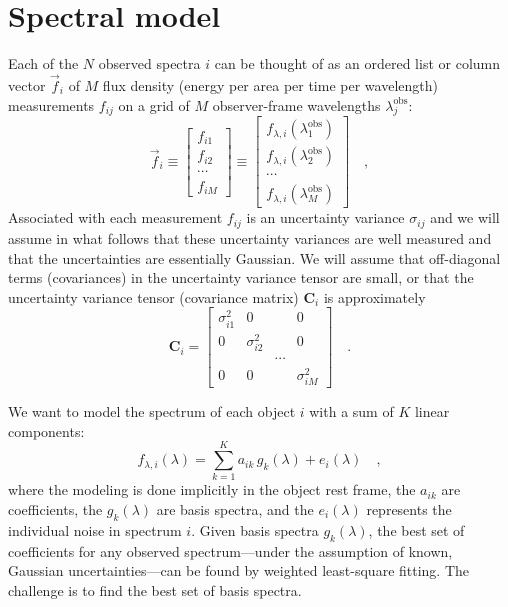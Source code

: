 \documentclass[12pt,preprint]{aastex}
\begin{document}
\section{Spectral model}\label{sec:model}
Each of the $N$ observed spectra $i$ can be thought of as an ordered
list or column vector $\vec{f}_i$ of $M$ flux density (energy per area
per time per wavelength) measurements $f_{ij}$ on a grid of $M$
observer-frame wavelengths $\lambda^{\mathrm{obs}}_j$:
\begin{equation}
\vec{f}_i
\equiv \left[\begin{array}{c} f_{i1} \\
                              f_{i2} \\
                              \cdots \\
                              f_{iM} \end{array}\right]
\equiv \left[\begin{array}{c} f_{\lambda,i}(\lambda^{\mathrm{obs}}_1) \\
                              f_{\lambda,i}(\lambda^{\mathrm{obs}}_2) \\
                                                \cdots \\
                              f_{\lambda,i}(\lambda^{\mathrm{obs}}_M) \end{array}\right]
\quad ,
\end{equation}
Associated with each measurement $f_{ij}$ is an uncertainty variance
$\sigma_{ij}$ and we will assume in what follows that these
uncertainty variances are well measured and that the uncertainties are
essentially Gaussian.  We will assume that off-diagonal terms
(covariances) in the uncertainty variance tensor are small, or that
the uncertainty variance tensor (covariance matrix) $\textbf{C}_i$ is
approximately
\begin{equation}
\textbf{C}_i =
 \left[\begin{array}{cccc} \sigma_{i1}^2 & 0 & & 0 \\
                           0 & \sigma_{i2}^2 & & 0 \\
                           & & \cdots & \\
                           0 & 0 & & \sigma_{iM}^2 \end{array}\right]
\quad .
\end{equation}

We want to model the spectrum of each object $i$ with a sum of $K$ linear components:
\begin{equation}\label{eq:model}
f_{\lambda,i}(\lambda) = \sum_{k=1}^{K} a_{ik}\,g_k(\lambda) + e_i(\lambda)
\quad ,
\end{equation}
where the modeling is done implicitly in the object rest frame, the
$a_{ik}$ are coefficients, the $g_k(\lambda)$ are basis spectra, and
the $e_i(\lambda)$ represents the individual noise in spectrum $i$.
Given basis spectra $g_k(\lambda)$, the best set of coefficients for
any observed spectrum---under the assumption of known, Gaussian
uncertainties---can be found by weighted least-square fitting.  The
challenge is to find the best set of basis spectra.
\end{document}
